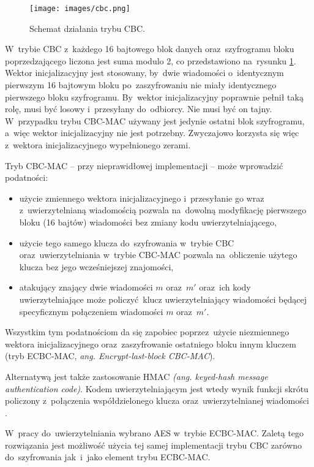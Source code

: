 \begin{figure}[ht]
\centering
\texttt{[image: images/cbc.png]}
\caption{Schemat działania trybu CBC.}
\label{fig:cbc}
\end{figure}

W~trybie CBC z~każdego 16 bajtowego blok danych oraz~szyfrogramu bloku poprzedzającego liczona jest suma modulo 2, co przedstawiono na~rysunku \ref{fig:cbc}. Wektor inicjalizacyjny jest stosowany, by~dwie wiadomości o~identycznym pierwszym 16 bajtowym bloku po~zaszyfrowaniu nie miały identycznego pierwszego bloku szyfrogramu. By~wektor inicjalizacyjny poprawnie pełnił taką rolę, musi być losowy i~przesyłany do~odbiorcy. Nie musi być on tajny. W~przypadku trybu CBC-MAC używany jest jedynie ostatni blok szyfrogramu, a~więc wektor inicjalizacyjny nie jest potrzebny. Zwyczajowo korzysta się więc z~wektora inicjalizacyjnego wypełnionego zerami.

\FloatBarrier

Tryb CBC-MAC -- przy nieprawidłowej implementacji -- może wprowadzić podatności:

\begin{itemize}
    \item użycie zmiennego wektora inicjalizacyjnego i~przesyłanie go wraz z~uwierzytelnianą wiadomością pozwala na~dowolną modyfikację pierwszego bloku (16 bajtów) wiadomości bez zmiany kodu uwierzytelniającego,
    \item użycie tego samego klucza do~szyfrowania w~trybie CBC oraz~uwierzytelniania w~trybie CBC-MAC pozwala na~obliczenie użytego klucza bez jego wcześniejszej znajomości,
    \item atakujący znający dwie wiadomości $ m $ oraz~$ m' $ oraz~ich kody uwierzytelniające może policzyć klucz uwierzytelniający wiadomości będącej specyficznym połączeniem wiadomości $ m $ oraz~$ m' $.
\end{itemize}

Wszystkim tym podatnościom da się zapobiec poprzez~użycie niezmiennego wektora inicjalizacyjnego oraz~zaszyfrowanie ostatniego bloku innym kluczem (tryb ECBC-MAC, {\itshape ang. Encrypt-last-block CBC-MAC}).

Alternatywą jest także zastosowanie HMAC {\itshape (ang. keyed-hash message authentication code)}. Kodem uwierzytelniającym jest wtedy wynik funkcji skrótu policzony z~połączenia współdzielonego klucza oraz~uwierzytelnianej wiadomości \cite{krawczyk1997hmac}.

W~pracy do~uwierzytelniania wybrano AES w~trybie ECBC-MAC. Zaletą tego rozwiązania jest możliwość użycia tej samej implementacji trybu CBC zarówno do~szyfrowania jak~i~jako element trybu ECBC-MAC.

